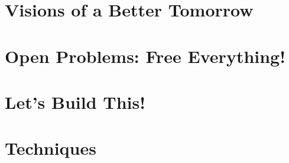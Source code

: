 \documentclass[ebook,12pt,openany]{memoir} %
\begin{document}
\chapter{Visions of a Better Tomorrow}


\chapter{Open Problems: Free Everything!}


\chapter{Let's Build This!}


\chapter{Techniques}

\end{document}
